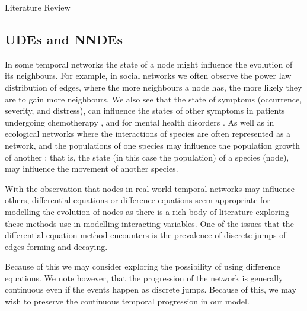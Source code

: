 \documentclass[12pt]{amsart}
\begin{document}
\begin{section}{Literature Review}
    \subsection{UDEs and NNDEs}
        In some temporal networks the state of a node might influence the evolution of its neighbours. For example, in social networks we often observe the power law distribution of edges, where the more neighbours a node has, the more likely they are to gain more neighbours\cite{zhao2012multi,garg2009evolution}. We also see that the state of symptoms (occurrence, severity, and distress), can influence the states of other symptoms in patients undergoing chemotherapy \cite{papachristou2019network,kalantari2022network}, and for mental health disorders \cite{contreras2020temporal}. As well as in ecological networks where the interactions of species are often represented as a network, and the populations of one species may influence the population growth of another \cite{elton2001animal,volterra1927variazioni}; that is, the state (in this case the population) of a species (node), may influence the movement of another species.
                
        With the observation that nodes in real world temporal networks may influence others, differential equations or difference equations seem appropriate for modelling the evolution of nodes as there is a rich body of literature exploring these methods use in modelling interacting variables. One of the issues that the differential equation method encounters is the prevalence of discrete jumps of edges forming and decaying.  
    
        Because of this we may consider exploring the possibility of using difference equations. We note however, that the progression of the network is generally continuous even if the events happen as discrete jumps. Because of this, we may wish to preserve the continuous temporal progression in our model.
        
        

\end{section}
\end{document}
